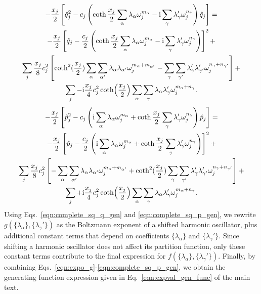 \documentclass[preprint,aip,jcp]{revtex4-2}
\newcommand{\im}{\textup{i}}
\begin{document}
\begin{multline}\label{eqn:complete_sq_q_gen}
    -\frac{x_j}{2}\left[\hat{q}_j^2 - c_j \left(\coth\frac{x_j}{2}\sum_{\alpha} \lambda_{\alpha} \omega_j^{m_{\alpha}} - \im \sum_{\gamma} \lambda_{\gamma}' \omega_j^{n_{\gamma}} \right) \hat{q}_j\right] = \\
    -\frac{x_j}{2}\left[\hat{q}_j - \frac{c_j}{2} \left(\coth\frac{x_j}{2}\sum_{\alpha} \lambda_{\alpha} \omega_j^{m_{\alpha}} - \im \sum_{\gamma} \lambda_{\gamma}' \omega_j^{n_{\gamma}} \right)\right]^2 + \\
    \sum_j \frac{x_j}{8} c_j^2 \left[\coth^2(\frac{x_j}{2}) \sum_{\alpha} \sum_{\alpha'} \lambda_{\alpha} \lambda_{\alpha'}\omega_j^{m_{\alpha} + m_{\alpha'}} - \sum_{\gamma} \sum_{\gamma'} \lambda_{\gamma}' \lambda_{\gamma'}' \omega_j^{n_{\gamma} + n_{\gamma'}} \right] + \\
    \sum_j -\im \frac{x_j}{4} c_j^2  \coth(\frac{x_j}{2}) \sum_{\alpha}\sum_{\gamma} \lambda_{\alpha} \lambda'_{\gamma} \omega_j^{m_{\alpha}+n_{\gamma}}.
\end{multline}
\begin{multline}\label{eqn:complete_sq_p_gen}
    -\frac{x_j}{2}\left[\hat{p}_j^2 - c_j \left(\im\sum_{\alpha} \lambda_{\alpha} \omega_j^{m_{\alpha}} + \coth\frac{x_j}{2} \sum_{\gamma} \lambda_{\gamma}' \omega_j^{n_{\gamma}} \right) \hat{p}_j\right] = \\
    -\frac{x_j}{2}\left[\hat{p}_j - \frac{c_j}{2} \left(\im\sum_{\alpha} \lambda_{\alpha} \omega_j^{m_{\alpha}} + \coth\frac{x_j}{2} \sum_{\gamma} \lambda_{\gamma}' \omega_j^{n_{\gamma}} \right)\right]^2 +\\
    \sum_j \frac{x_j}{8} c_j^2 \left[-\sum_{\alpha} \sum_{\alpha'} \lambda_{\alpha} \lambda_{\alpha'}\omega_j^{m_{\alpha} + m_{\alpha'}} + \coth^2(\frac{x_j}{2})  \sum_{\gamma} \sum_{\gamma'} \lambda_{\gamma}' \lambda_{\gamma'}' \omega_j^{n_{\gamma} + n_{\gamma'}} \right] + \\
    \sum_j +\im \frac{x_j}{4} c_j^2  \coth(\frac{x_j}{2}) \sum_{\alpha}\sum_{\gamma} \lambda_{\alpha} \lambda'_{\gamma} \omega_j^{m_{\alpha}+n_{\gamma}}.
\end{multline}
Using Eqs.~\ref{eqn:complete_sq_q_gen} and \ref{eqn:complete_sq_p_gen}, we rewrite $g(\{\lambda_{\alpha}\}, \{\lambda_{\gamma}'\})$ as the Boltzmann exponent of a shifted harmonic oscillator, plus additional constant terms that depend on coefficients $\{\lambda_\alpha\}$ and $\{\lambda_{\gamma}'\}$. Since shifting a harmonic oscillator does not affect its partition function, only these constant terms contribute to the final expression for $f(\{\lambda_{\alpha}\}, \{\lambda_{\gamma}'\})$. Finally, by combining Eqs.~\ref{eqn:expo_g}-\ref{eqn:complete_sq_p_gen}, we obtain the generating function expression given in Eq.~\ref{eqn:expval_gen_func} of the main text.
\end{document}
